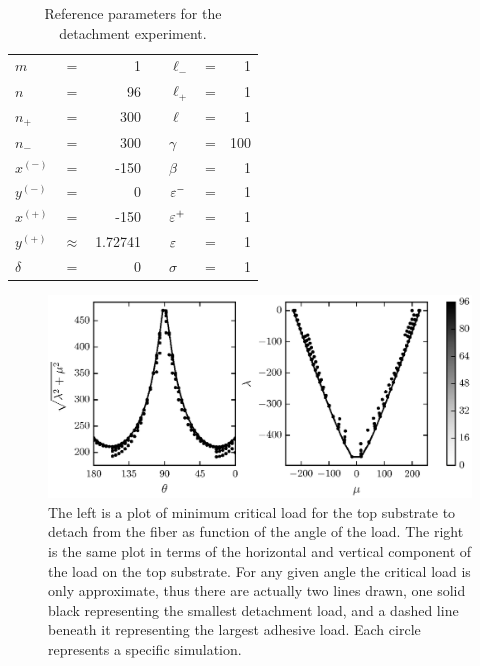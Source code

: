 	\begin{table}
		\centering
		\caption{Reference parameters for the detachment experiment. \label{table:detachment_reference}}
		\begin{tabular}{lcrclcr}
			$m$ & = & 1 & \hspace{1in} & $\ell_-$ & = & 1 \\
			$n$ & = & 96 & & $\ell_+$ & = & 1 \\
			$n_+$ & = & 300 & & $\ell$ & = & 1 \\
			$n_-$ & = & 300 & & $\gamma$ & = & 100 \\
			$x^{(-)}$ & = & -150 & & $\beta$ & = & 1 \\
			$y^{(-)}$ & = & 0 & & $\varepsilon^-$ & = & 1 \\
			$x^{(+)}$ & = & -150 & & $\varepsilon^+$ & = & 1 \\
			$y^{(+)}$ & $\approx$ & 1.72741 & & $\varepsilon$ & = & 1 \\
			$\delta$ & = & 0 & & $\sigma$ & = & 1
		\end{tabular}
	\end{table}
	
	\begin{figure}
		\begin{center}
			\includegraphics{./fig/ch3/pull/ref/grid.eps}
		\end{center}		
		\caption{The left is a plot of minimum critical load for the top substrate to detach from the fiber as function of the angle of the load. The right is the same plot in terms of the horizontal and vertical component of the load on the top substrate. For any given angle the critical load is only approximate, thus there are actually two lines drawn, one solid black representing the smallest detachment load, and a dashed line beneath it representing the largest adhesive load. Each circle represents a specific simulation.
		\label{fig:pull:ref}}
	\end{figure}

